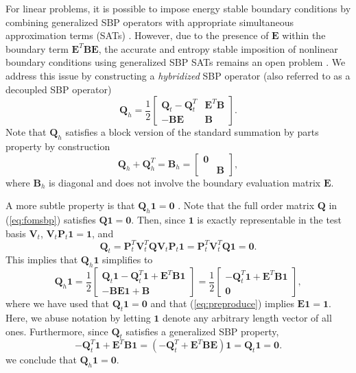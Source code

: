 \documentclass[review]{siamart171218}
\theoremstyle{assumption}
\newcommand{\LRp}[1]{\left( #1 \right)}
\begin{document}
For linear problems, it is possible to impose energy stable boundary conditions by combining generalized SBP operators with appropriate simultaneous approximation terms (SATs) \cite{fernandez2014review, fernandez2018simultaneous}.  However, due to the presence of $\bm{E}$ within the boundary term $\bm{E}^T\bm{B}\bm{E}$, the accurate and entropy stable imposition of nonlinear boundary conditions using generalized SBP SATs remains an open problem \cite{crean2018entropy, chan2018efficient, chenreview}. We address this issue by constructing a \textit{hybridized} SBP operator (also referred to as a decoupled SBP operator) \cite{chan2017discretely, chan2019skew}
\[
\bm{Q}_{h} = \frac{1}{2}\begin{bmatrix}
\bm{Q}_t - \bm{Q}_t^T & \bm{E}^T\bm{B} \\
-\bm{B}\bm{E} & \bm{B}
\end{bmatrix}.
\]
Note that $\bm{Q}_h$ satisfies a block version of the standard summation by parts property by construction
\[
\bm{Q}_h + \bm{Q}_h^T = \bm{B}_h = \begin{bmatrix}
\bm{0} & \\
& \bm{B} \end{bmatrix},  
\]
where $\bm{B}_h$ is diagonal and does not involve the boundary evaluation matrix $\bm{E}$.  

A more subtle property is that $\bm{Q}_h\bm{1} = \bm{0}$ \cite{chan2019skew}.  Note that the full order matrix $\bm{Q}$ in (\ref{eq:fomsbp}) satisfies $\bm{Q}\bm{1} = \bm{0}$.  Then, since $\bm{1}$ is exactly representable in the test basis $\bm{V}_t$, $\bm{V}_t\bm{P}_t\bm{1} = \bm{1}$, and
\[
\bm{Q}_t = \bm{P}_t^T\bm{V}_t^T\bm{Q}\bm{V}_t\bm{P}_t\bm{1} = \bm{P}_t^T\bm{V}_t^T\bm{Q}\bm{1} = \bm{0}.
\]
This implies that $\bm{Q}_h\bm{1}$ simplifies to
\[
\bm{Q}_h \bm{1} =  \frac{1}{2}\begin{bmatrix}
\bm{Q}_t \bm{1} - \bm{Q}_t^T \bm{1} + \bm{E}^T\bm{B} \bm{1} \\
- \bm{B}\bm{E} \bm{1} + \bm{B}
\end{bmatrix}=\frac{1}{2}\begin{bmatrix}
- \bm{Q}_t^T \bm{1} + \bm{E}^T\bm{B} \bm{1} \\
\bm{0}
\end{bmatrix},
\]
where we have used that $\bm{Q}_t\bm{1} = \bm{0}$ and that (\ref{eq:preproduce}) implies $\bm{E}\bm{1} = \bm{1}$.   Here, we abuse notation by letting $\bm{1}$ denote any arbitrary length vector of all ones.  Furthermore, since $\bm{Q}_t$ satisfies a generalized SBP property,
\[
- \bm{Q}_t^T \bm{1} + \bm{E}^T\bm{B} \bm{1} = \LRp{-\bm{Q}_t^T + \bm{E}^T\bm{B}\bm{E}} \bm{1} = \bm{Q}_t \bm{1} = \bm{0}.
\]
we conclude that $\bm{Q}_h\bm{1} = \bm{0}$.
\end{document}
